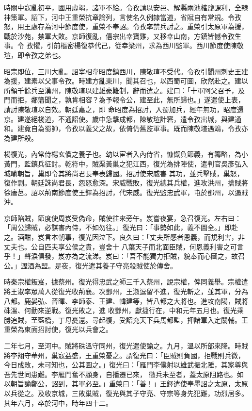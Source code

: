 \begin{pinyinscope}
 時關中寇亂初平，國用虛竭，諸軍不給。令孜請以安邑、解縣兩池榷鹽課利，全隸神策軍。詔下，河中王重榮抗章論列，言使名久例隸當道，省賦自有常規。令孜怒，用王處存為河中節度使，重榮不奉詔。令孜率禁兵討之。重榮引太原軍為援，戰於沙苑，禁軍大敗。京師復亂，僖宗出幸寶雞，又移幸山南，方鎮皆憾令孜生事。令
 孜懼，引前樞密楊復恭代己，從幸梁州，求為西川監軍。西川節度使陳敬瑄，即令孜之弟也。



 昭宗即位，三川大亂。詔宰相韋昭度鎮西川，陳敬瑄不受代。令孜引閬州刺史王建為援，建素以父事令孜。時建方亂東川，聞其召也，以西蜀可圖，欣然赴之。建以所領千餘兵至漢州，陳敬瑄以建雄豪難制，辭而遣之。建曰：「十軍阿父召予，及門而拒，鄰籓聞之，孰肯相容？為予報令公，建至此，無所歸也。」遂遣使上表，請討陳敬瑄以自效。朝廷嘉之，即
 命昭度為招討，入蜀加兵，經年無功，昭度還京。建遂絕棧道，不通詔使。歲中急擊成都，陳敬瑄計窘，遣令孜出城，與建通和。建竟自為蜀帥，令孜以義父之故，依倚仍舊監軍事。既而陳敬瑄遇鴆，令孜亦為建所殺。



 楊復光，內常侍楊玄價之養子也。幼以宦者入內侍省，慷慨負節義，有籌略，為小黃門，監鎮兵征討。乾符中，賊渠黃巢之犯江西，復光為排陣使，遣判官吳彥弘入城喻朝旨，巢即令其將尚君長奉表歸國。招討使宋威害
 其功，並兵擊賊，巢怒，復作剽。朝廷誅尚君長，怨怒愈深。宋威戰敗，復光總其兵權，進攻洪州，擒賊將徐唐莒。詔以荊南節度使王鐸為招討，代宋威。復光監忠武軍，屯於鄧州，以遏賊沖。



 京師陷賊，節度使周岌受偽命，賊使往來旁午。岌嘗夜宴，急召復光。左右曰：「周公歸賊，必謀害內侍，不如勿往。」復光曰：「事勢如此，義不圖全。」即赴之。酒酣，岌言本朝事，復光因泣下。良久曰：「丈夫所感者恩義，而規利害，非丈夫也。公自匹夫享公侯之貴，豈舍十
 八葉天子而北面臣賊，何恩義利害之可言乎！」聲淚俱發，岌亦為之流涕。岌曰：「吾不能獨力拒賊，貌奉而心圖之，故召公。」瀝酒為盟。是夜，復光遣其養子守亮殺賊使於傳舍。



 時秦宗權叛岌，據蔡州。復光得忠武之師三千入蔡州，說宗權，俾同義舉。宗權遣將王淑率眾萬人從復光收荊襄。次鄧州，王淑逗留不進，復光斬之，並其軍，分為八都。鹿晏弘、晉暉、李師泰、王建、韓建等，皆八都之大將也。進攻南陽，賊將硃溫、何勤來逆戰。復光敗之，進
 收鄧州，獻捷行在，中和元年五月也。復光乘勝追賊，至藍橋，丁母憂還。尋起復，受詔充天下兵馬都監，押諸軍入定關輔。王重榮為東面招討使，復光以兵會之。



 二年七月，至河中。賊將硃溫守同州，復光遣使諭之。九月，溫以所部來降。時賊將李翔守華州，巢寇益盛，王重榮憂之。謂復光曰：「臣賊則負國，拒戰則兵微，今日成敗，未可知也，公其圖之。」復光曰：「雁門李僕射以雄武振北陲，其家尊與吾先世同患難。李雁門奮不顧身，自播遷已來，
 徵兵未至者，蓋太原阻路也。如以朝旨諭鄭公，詔到，其軍必至。」重榮曰：「善！」王鐸遣使奉墨詔之太原，太原以兵從之。及收京城，三敗巢賊，復光與其子守亮、守宗等身先犯難，功烈居多。其年六月，卒於河中，時年四十二。




\end{pinyinscope}
